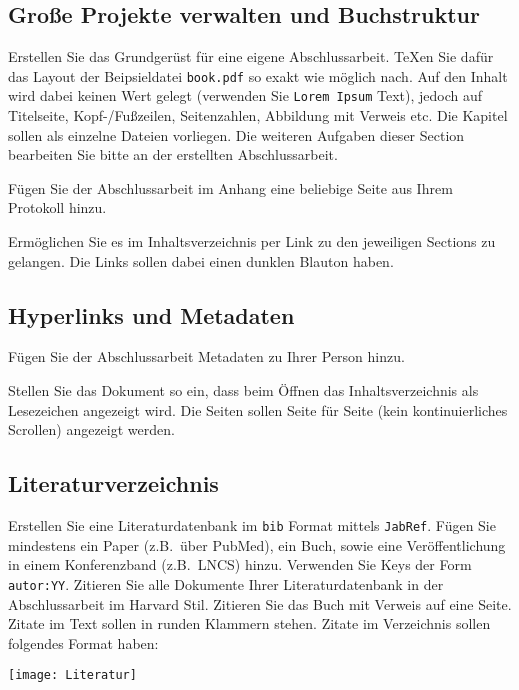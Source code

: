 \subsection{Große Projekte verwalten und Buchstruktur}

\begin{aufgabe}
Erstellen Sie das Grundger\"ust f\"ur eine eigene Abschlussarbeit. \TeX en
Sie daf\"ur das Layout der Beipsieldatei \texttt{book.pdf} so exakt wie
m\"oglich nach. Auf den Inhalt wird dabei keinen Wert gelegt (verwenden Sie
\texttt{Lorem Ipsum} Text), jedoch auf Titelseite, Kopf-/Fu\ss zeilen,
Seitenzahlen, Abbildung mit Verweis etc. Die Kapitel sollen als einzelne
Dateien vorliegen. Die weiteren Aufgaben dieser Section bearbeiten Sie bitte
an der erstellten Abschlussarbeit. 
\end{aufgabe}

\begin{aufgabe}
F\"ugen Sie der Abschlussarbeit im Anhang eine beliebige Seite aus Ihrem Protokoll hinzu. 
\end{aufgabe}

\begin{aufgabe}
Erm\"oglichen Sie es im Inhaltsverzeichnis per Link zu den jeweiligen Sections zu gelangen. Die Links sollen dabei einen dunklen Blauton haben.  
\end{aufgabe}

\subsection{Hyperlinks und Metadaten}
\begin{aufgabe}
F\"ugen Sie der Abschlussarbeit Metadaten zu Ihrer Person hinzu.
\end{aufgabe}

\begin{aufgabe}
Stellen Sie das Dokument so ein, dass beim \"Offnen das Inhaltsverzeichnis als Lesezeichen angezeigt wird. Die Seiten sollen Seite f\"ur Seite (kein kontinuierliches Scrollen) angezeigt werden. 	
\end{aufgabe}

\subsection{Literaturverzeichnis}
\begin{aufgabe}
Erstellen Sie eine Literaturdatenbank im \texttt{bib} Format mittels
\texttt{JabRef}. F\"ugen Sie mindestens ein Paper (z.B.\ \"uber PubMed), ein
Buch, sowie eine Ver\"offentlichung in einem Konferenzband (z.B.\ LNCS)
hinzu. Verwenden Sie Keys der Form \texttt{autor:YY}. Zitieren Sie alle
Dokumente Ihrer Literaturdatenbank in der Abschlussarbeit im Harvard Stil. Zitieren Sie das
Buch mit Verweis auf eine Seite. Zitate im Text sollen in runden Klammern
stehen. Zitate im Verzeichnis sollen folgendes Format haben:

\medskip
\noindent\texttt{[image: Literatur]}
\end{aufgabe}
